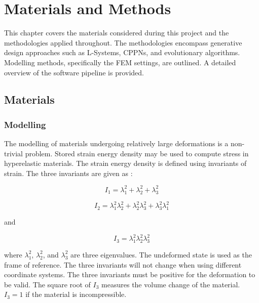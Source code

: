 \chapter{Materials and Methods}
\label{chp:MaM}


This chapter covers the materials considered during this project and the methodologies applied throughout. The methodologies encompass generative design approaches such as L-Systems, CPPNs, and evolutionary algorithms. Modelling methods, specifically the FEM settings, are outlined. A detailed overview of the software pipeline is provided.

\section{Materials}

\subsection{Modelling}

The modelling of materials undergoing relatively large deformations is a non-trivial problem. Stored strain energy density may be used to compute stress in hyperelastic materials. The strain energy density is defined using invariants of strain. The three invariants are given as \citep{Kim2015}:

\begin{equation}
	I_{1}=\lambda_{1}^{2}+\lambda_{2}^{2}+\lambda_{3}^{2}
\end{equation}

\begin{equation}
	I_{2}=\lambda_{1}^{2}\lambda_{2}^{2}+\lambda_{2}^{2}\lambda_{3}^{2}+\lambda_{3}^{2}\lambda_{1}^{2}
\end{equation}

and

\begin{equation}
	I_{3}=\lambda_{1}^{2}\lambda_{2}^{2}\lambda_{3}^{2}
\end{equation}

where $\lambda_{1}^{2}$, $\lambda_{2}^{2}$, and $\lambda_{3}^{2}$ are three eigenvalues. The undeformed state is used as the frame of reference. The three invariants will not change when using different coordinate systems. The three invariants must be positive for the deformation to be valid. The square root of $I_{3}$ measures the volume change of the material. $I_{3}=1$ if the material is incompressible. \citep{Kim2015}

